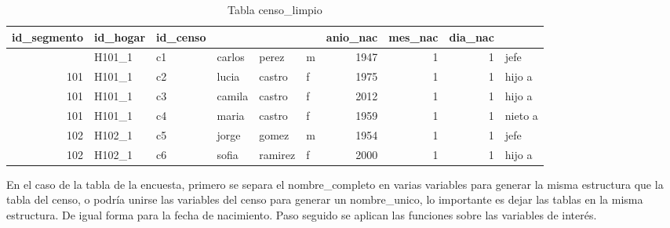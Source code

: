 \documentclass[
  12pt,
]{book}
\begin{document}
\begin{table}[t]
\caption*{
{\fontsize{20}{25}\selectfont  Tabla censo\_limpio\fontsize{12}{15}\selectfont }
} 
\fontsize{12.0pt}{14.0pt}\selectfont
\begin{tabular*}{\linewidth}{@{\extracolsep{\fill}}rlllllrrrl}
\toprule
id\_segmento & id\_hogar & id\_censo & {\bfseries \cellcolor[HTML]{F9F9F9}{nombre}} & {\bfseries \cellcolor[HTML]{F9F9F9}{apellido}} & {\bfseries \cellcolor[HTML]{F9F9F9}{sexo}} & anio\_nac & mes\_nac & dia\_nac & {\bfseries \cellcolor[HTML]{F9F9F9}{parentesco}} \\ 
\midrule\addlinespace[2.5pt]
101 & H101\_1 & c1 & carlos & perez & m & 1947 & 1 & 1 & jefe \\ 
101 & H101\_1 & c2 & lucia & castro & f & 1975 & 1 & 1 & hijo a \\ 
101 & H101\_1 & c3 & camila & castro & f & 2012 & 1 & 1 & hijo a \\ 
101 & H101\_1 & c4 & maria & castro & f & 1959 & 1 & 1 & nieto a \\ 
102 & H102\_1 & c5 & jorge & gomez & m & 1954 & 1 & 1 & jefe \\ 
102 & H102\_1 & c6 & sofia & ramirez & f & 2000 & 1 & 1 & hijo a \\ 
\bottomrule
\end{tabular*}
\end{table}

En el caso de la tabla de la encuesta, primero se separa el nombre\_completo en varias variables para generar la misma estructura que la tabla del censo, o podría unirse las variables del censo para generar un nombre\_unico, lo importante es dejar las tablas en la misma estructura. De igual forma para la fecha de nacimiento. Paso seguido se aplican las funciones sobre las variables de interés.
\end{document}

